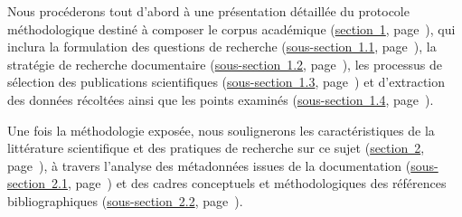 \begin{refsegment}
Nous procéderons tout d'abord à une présentation détaillée du protocole méthodologique destiné à composer le corpus académique (\hyperref[chap2:protocole-methodologique-rsl]{section~1}, page~\pageref{chap2:protocole-methodologique-rsl}), qui inclura la formulation des questions de recherche (\hyperref[chap2:formulation-questions-recherche]{sous-section~1.1}, page~\pageref{chap2:formulation-questions-recherche}), la stratégie de recherche documentaire (\hyperref[chap2:strategie-recherche-documentaire]{sous-section~1.2}, page~\pageref{chap2:strategie-recherche-documentaire}), les processus de sélection des publications scientifiques (\hyperref[chap2:selection-publications-scientifiques]{sous-section~1.3}, page~\pageref{chap2:selection-publications-scientifiques}) et d'extraction des données récoltées ainsi que les points examinés (\hyperref[chap2:extraction-donnees-aspects-consideres]{sous-section~1.4}, page~\pageref{chap2:extraction-donnees-aspects-consideres}).%

Une fois la méthodologie exposée, nous soulignerons les caractéristiques de la littérature scientifique et des pratiques de recherche sur ce sujet (\hyperref[chap2:analyse-documentation-rsl]{section~2}, page~\pageref{chap2:analyse-documentation-rsl}), à travers l'analyse des métadonnées issues de la documentation (\hyperref[chap2:etat-litterature-scientifique-internationale-btod]{sous-section~2.1}, page~\pageref{chap2:etat-litterature-scientifique-internationale-btod}) et des cadres conceptuels et méthodologiques des références bibliographiques (\hyperref[chap2:cadres-conceptuels-methodologiques]{sous-section~2.2}, page~\pageref{chap2:cadres-conceptuels-methodologiques}).%


\end{refsegment}
